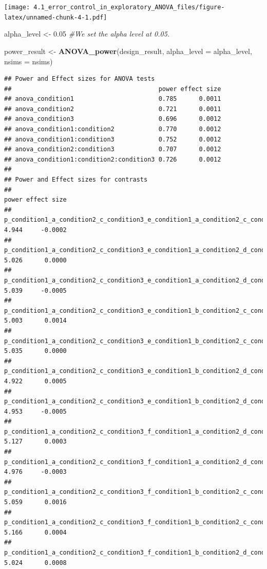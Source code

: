 \documentclass[]{article}
\newenvironment{Shaded}{\begin{snugshade}}{\end{snugshade}}
\newcommand{\KeywordTok}[1]{\textcolor[rgb]{0.13,0.29,0.53}{\textbf{#1}}}
\newcommand{\DataTypeTok}[1]{\textcolor[rgb]{0.13,0.29,0.53}{#1}}
\newcommand{\FloatTok}[1]{\textcolor[rgb]{0.00,0.00,0.81}{#1}}
\newcommand{\StringTok}[1]{\textcolor[rgb]{0.31,0.60,0.02}{#1}}
\newcommand{\CommentTok}[1]{\textcolor[rgb]{0.56,0.35,0.01}{\textit{#1}}}
\newcommand{\NormalTok}[1]{#1}
\begin{document}
\texttt{[image: 4.1\_error\_control\_in\_exploratory\_ANOVA\_files/figure-latex/unnamed-chunk-4-1.pdf]}

\begin{Shaded}
\begin{Highlighting}[]
\NormalTok{alpha_level <-}\StringTok{ }\FloatTok{0.05}
\CommentTok{#We set the alpha level at 0.05. }

\NormalTok{power_result <-}\StringTok{ }\KeywordTok{ANOVA_power}\NormalTok{(design_result, }\DataTypeTok{alpha_level =}\NormalTok{ alpha_level, }\DataTypeTok{nsims =}\NormalTok{ nsims)}
\end{Highlighting}
\end{Shaded}

\begin{verbatim}
## Power and Effect sizes for ANOVA tests
##                                        power effect size
## anova_condition1                       0.785      0.0011
## anova_condition2                       0.721      0.0011
## anova_condition3                       0.696      0.0012
## anova_condition1:condition2            0.770      0.0012
## anova_condition1:condition3            0.752      0.0012
## anova_condition2:condition3            0.707      0.0012
## anova_condition1:condition2:condition3 0.726      0.0012
## 
## Power and Effect sizes for contrasts
##                                                                                 power effect size
## p_condition1_a_condition2_c_condition3_e_condition1_a_condition2_c_condition3_f 4.944     -0.0002
## p_condition1_a_condition2_c_condition3_e_condition1_a_condition2_d_condition3_e 5.026      0.0000
## p_condition1_a_condition2_c_condition3_e_condition1_a_condition2_d_condition3_f 5.039     -0.0005
## p_condition1_a_condition2_c_condition3_e_condition1_b_condition2_c_condition3_e 5.003      0.0014
## p_condition1_a_condition2_c_condition3_e_condition1_b_condition2_c_condition3_f 5.035      0.0000
## p_condition1_a_condition2_c_condition3_e_condition1_b_condition2_d_condition3_e 4.922      0.0005
## p_condition1_a_condition2_c_condition3_e_condition1_b_condition2_d_condition3_f 4.953     -0.0005
## p_condition1_a_condition2_c_condition3_f_condition1_a_condition2_d_condition3_e 5.127      0.0003
## p_condition1_a_condition2_c_condition3_f_condition1_a_condition2_d_condition3_f 4.976     -0.0003
## p_condition1_a_condition2_c_condition3_f_condition1_b_condition2_c_condition3_e 5.059      0.0016
## p_condition1_a_condition2_c_condition3_f_condition1_b_condition2_c_condition3_f 5.166      0.0004
## p_condition1_a_condition2_c_condition3_f_condition1_b_condition2_d_condition3_e 5.024      0.0008

\end{verbatim}
\end{document}
